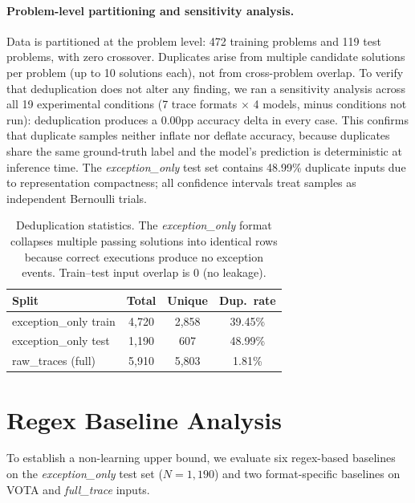 \paragraph{Problem-level partitioning and sensitivity analysis.}
Data is partitioned at the problem level: 472 training problems and 119 test problems, with zero crossover.
Duplicates arise from multiple candidate solutions per problem (up to 10 solutions each), not from cross-problem overlap.
To verify that deduplication does not alter any finding, we ran a sensitivity analysis across all 19 experimental conditions (7 trace formats $\times$ 4 models, minus conditions not run): deduplication produces a 0.00pp accuracy delta in every case.
This confirms that duplicate samples neither inflate nor deflate accuracy, because duplicates share the same ground-truth label and the model's prediction is deterministic at inference time.
The \textit{exception\_only} test set contains 48.99\% duplicate inputs due to representation compactness; all confidence intervals treat samples as independent Bernoulli trials.

\begin{table}[h!]
\centering
\caption{Deduplication statistics. The \textit{exception\_only} format collapses multiple passing solutions into identical rows because correct executions produce no exception events. Train--test input overlap is 0 (no leakage).}
\label{tab:dedup}
\small
\begin{tabular}{lccc}
\toprule
\textbf{Split} & \textbf{Total} & \textbf{Unique} & \textbf{Dup.\ rate} \\
\midrule
exception\_only train & 4{,}720 & 2{,}858 & 39.45\% \\
exception\_only test  & 1{,}190 &   607 & 48.99\% \\
raw\_traces (full)    & 5{,}910 & 5{,}803 &  1.81\% \\
\bottomrule
\end{tabular}
\end{table}

\section{Regex Baseline Analysis}
\label{sec:regex_baselines}

To establish a non-learning upper bound, we evaluate six regex-based baselines on the \textit{exception\_only} test set ($N{=}1{,}190$) and two format-specific baselines on VOTA and \textit{full\_trace} inputs.

